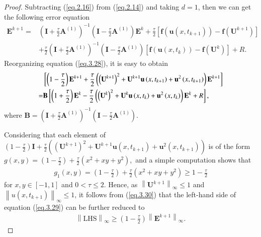 \documentclass{siamart171218}
\numberwithin{theorem}{section}
\numberwithin{equation}{section}
\begin{document}
\begin{proof}
Subtracting (\ref{eq.2.16}) from (\ref{eq.2.14}) and taking $d=1$, then we
can get the following error equation
\begin{equation}\label{eq.3.28}
\begin{aligned}\displaystyle
\mathbf{E}^{k+1}=&\left(
\mathbf{I}+\frac{\tau}{2}\mathbf{A}^{(1)}
\right)^{-1}\left(
\mathbf{I}-\frac{\tau}{2}\mathbf{A}^{(1)}
\right)\mathbf{E}^{k}+
\frac{\tau}{2}
\left[\mathbf{f}\left(\mathbf{u}\left(x,t_{k+1}\right)\right)
-\mathbf{f}\left(\mathbf{U}^{k+1}\right)\right]\\&+
\frac{\tau}{2}\left(
\mathbf{I}+\frac{\tau}{2}\mathbf{A}^{(1)}
\right)^{-1}\left(
\mathbf{I}-\frac{\tau}{2}\mathbf{A}^{(1)}
\right)\left[\mathbf{f}\left(\mathbf{u}\left(x,t_{k}\right)\right)
-\mathbf{f}\left(\mathbf{U}^{k}\right)\right]+R
.
\end{aligned}
\end{equation}
Reorganizing equation (\ref{eq.3.28}), it is easy to obtain
\begin{equation}\label{eq.3.29}
\begin{aligned}\displaystyle
&\left[\left(1-\frac{\tau}{2}\right)\mathbf{E}^{k+1}
+\frac{\tau}{2}\left(\left(\mathbf{U}^{k+1}\right)^2+
\mathbf{U}^{k+1}\mathbf{u}\left(x,t_{k+1}\right)
+\mathbf{u}^2\left(x,t_{k+1}\right)\right)\mathbf{E}^{k+1}
\right]\\
=&\mathbf{B}
\left[\left(1+\frac{\tau}{2}\right)\mathbf{E}^{k}
-\frac{\tau}{2}\left(\left(\mathbf{U}^{k}\right)^2+
\mathbf{U}^{k}\mathbf{u}\left(x,t_{k}\right)
+\mathbf{u}^2\left(x,t_{k}\right)\right)\mathbf{E}^{k}
+R\right],
\end{aligned}
\end{equation}
where $\mathbf{B}=\left(
\mathbf{I}+\frac{\tau}{2}\mathbf{A}^{(1)}
\right)^{-1}\left(
\mathbf{I}-\frac{\tau}{2}\mathbf{A}^{(1)}
\right)$.

Considering that each element of  $\left(1-\frac{\tau}{2}\right)\mathbf{I}
+\frac{\tau}{2}\left(\left(\mathbf{U}^{k+1}\right)^2+
\mathbf{U}^{k+1}\mathbf{u}\left(x,t_{k+1}\right)
+\mathbf{u}^2\left(x,t_{k+1}\right)\right)$ is of the form
$
g(x,y)=\left(1-\frac{\tau}{2}\right)
+\frac{\tau}{2}\left(x^2+
xy
+y^2\right),
$
and a simple computation shows that
\begin{equation}\label{eq.3.30}
\begin{aligned}\displaystyle
g_1(x,y)=\left(1-\frac{\tau}{2}\right)
+\frac{\tau}{2}\left(x^2+
xy
+y^2\right)\geq1-\frac{\tau}{2}
\end{aligned}
\end{equation}
for $x,y\in[-1,1]$ and $0<\tau\leq2$.
Hence, as $\left\|\mathbf{U}^{k+1}\right\|_\infty\leq1$
and $\left\|u\left(x,t_{k+1}\right)\right\|_\infty\leq1$,
it follows from (\ref{eq.3.30}) that
the left-hand side of equation (\ref{eq.3.29}) can be further reduced to
\begin{equation}\label{eq.3.31}
\begin{aligned}\displaystyle
\left\|\mathrm{LHS}\right\|_\infty
\geq\left(1-\frac{\tau}{2}\right)\left\|\mathbf{E}^{k+1}\right\|_\infty.
\end{aligned}
\end{equation}


\end{proof}
\end{document}
